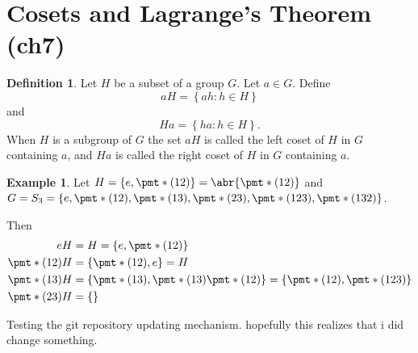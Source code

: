 \documentclass[11pt]{article}
\newcommand{\cbr}[1]{\left\{#1\right\}}
\theoremstyle{remark}
\theoremstyle{definition}
\newtheorem{definition}{Definition}[section]
\theoremstyle{remark}
\theoremstyle{definition}
\newtheorem*{example}{Example}
\theoremstyle{remark}
\begin{document}
\section{Cosets and Lagrange's Theorem (ch7)}

\begin{definition}
  Let $H$ be a subset of a group $G$. Let $a\in G$. Define $$aH = \cbr{ah : h\in H}$$ and $$Ha = \cbr{ha : h\in H}.$$ When $H$ is a subgroup of $G$ the set $aH$ is called the left coset of $H$ in $G$ containing $a$, and $Ha$ is called the right coset of $H$ in $G$ containing $a$.
\end{definition}

\begin{example}
  Let $H = \cbr{e,\pmt*{(12)}} = \abr{\pmt*{(12)}}$ and $G = S_3 = \cbr{e,\pmt*{(12)}, \pmt*{(13)}, \pmt*{(23)}, \pmt*{(123)}, \pmt*{(132)} }$.

  Then \begin{align*}
    eH &= H = \cbr{e,\pmt*{(12)}}\\
    \pmt*{(12)}H &= \cbr{\pmt*{(12)},e} = H\\ 
    \pmt*{(13)}H &= \cbr{\pmt*{(13)}, \pmt*{(13)}\pmt*{(12)}} = \cbr{\pmt*{(12)}, \pmt*{(123)}} \\
    \pmt*{(23)}H &= \cbr{}
  \end{align*}
\end{example}

Testing the git repository updating mechanism.
hopefully this realizes that i did change something.
\end{document}
